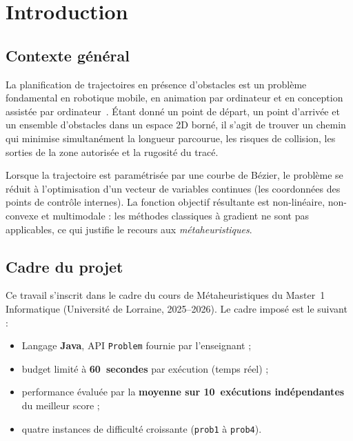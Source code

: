 \section{Introduction}
\label{sec:intro}

\subsection{Contexte général}

La planification de trajectoires en présence d'obstacles est un problème
fondamental en robotique mobile, en animation par ordinateur et en conception
assistée par ordinateur~\cite{latombe1991}.  Étant donné un point de départ, un
point d'arrivée et un ensemble d'obstacles dans un espace 2D borné, il s'agit
de trouver un chemin qui minimise simultanément la longueur parcourue, les
risques de collision, les sorties de la zone autorisée et la rugosité du tracé.

Lorsque la trajectoire est paramétrisée par une courbe de Bézier, le problème
se réduit à l'optimisation d'un vecteur de variables continues (les coordonnées
des points de contrôle internes).  La fonction objectif résultante est
non-linéaire, non-convexe et multimodale : les méthodes classiques à gradient
ne sont pas applicables, ce qui justifie le recours aux
\textit{métaheuristiques}.

\subsection{Cadre du projet}

Ce travail s'inscrit dans le cadre du cours de Métaheuristiques du Master~1
Informatique (Université de Lorraine, 2025--2026).  Le cadre imposé est le
suivant :
\begin{itemize}[nosep]
  \item Langage \textbf{Java}, API \texttt{Problem} fournie par l'enseignant ;
  \item budget limité à \textbf{60~secondes} par exécution (temps réel) ;
  \item performance évaluée par la \textbf{moyenne sur 10~exécutions
        indépendantes} du meilleur score ;
  \item quatre instances de difficulté croissante (\texttt{prob1} à
        \texttt{prob4}).
\end{itemize}

